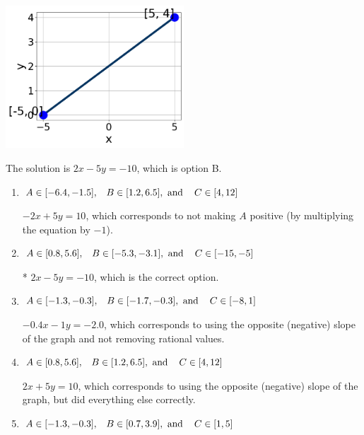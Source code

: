\documentclass{extbook}[14pt]
\begin{document}
\begin{enumerate}
{\begin{center}
    \includegraphics[width=0.5\textwidth]{../Figures/linearGraphToStandardCopyB.png}
\end{center}


The solution is \( 2x - 5y = -10 \), which is option B.\begin{enumerate}[label=\Alph*.]
\item \( A \in [-6.4, -1.5], \hspace{3mm} B \in [1.2, 6.5], \text{ and } \hspace{3mm} C \in [4, 12] \)

 $-2x + 5y = 10$, which corresponds to not making $A$ positive (by multiplying the equation by $-1$).
\item \( A \in [0.8, 5.6], \hspace{3mm} B \in [-5.3, -3.1], \text{ and } \hspace{3mm} C \in [-15, -5] \)

* $2x - 5y = -10$, which is the correct option.
\item \( A \in [-1.3, -0.3], \hspace{3mm} B \in [-1.7, -0.3], \text{ and } \hspace{3mm} C \in [-8, 1] \)

 $-0.4x - 1y = -2.0$, which corresponds to using the opposite (negative) slope of the graph and not removing rational values.
\item \( A \in [0.8, 5.6], \hspace{3mm} B \in [1.2, 6.5], \text{ and } \hspace{3mm} C \in [4, 12] \)

 $2x + 5y = 10$, which corresponds to using the opposite (negative) slope of the graph, but did everything else correctly.
\item \( A \in [-1.3, -0.3], \hspace{3mm} B \in [0.7, 3.9], \text{ and } \hspace{3mm} C \in [1, 5] \)


\end{enumerate}}
\end{enumerate}
\end{document}

